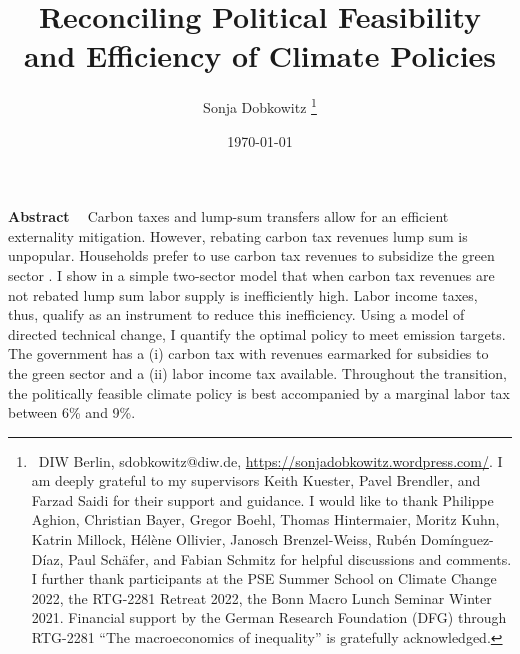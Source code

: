 \documentclass[12pt]{article}
\title{Reconciling Political Feasibility and Efficiency of Climate Policies}
\author{Sonja Dobkowitz
\thanks{\ {DIW Berlin, sdobkowitz@diw.de, \url{https://sonjadobkowitz.wordpress.com/}.} \newline
	I am deeply grateful to my supervisors Keith Kuester, Pavel Brendler, and Farzad Saidi for their support and guidance. 
	I would like to thank Philippe Aghion, Christian Bayer, Gregor Boehl, Thomas Hintermaier,  Moritz Kuhn, Katrin Millock, Hélène Ollivier,  Janosch Brenzel-Weiss, Rubén Domínguez-Díaz, Paul Schäfer, and Fabian Schmitz for helpful discussions and comments.  
	I further thank participants at the PSE Summer School on Climate Change 2022, the RTG-2281 Retreat 2022, the Bonn Macro Lunch Seminar Winter 2021.
	Financial support by the German Research Foundation (DFG) through RTG-2281 “The macroeconomics of inequality” is gratefully acknowledged.}}
\date{\today %
}
\renewenvironment{abstract}
{\small
	\list{}{
		\setlength{\leftmargin}{0.025\textwidth}%
		\setlength{\rightmargin}{\leftmargin}%
	}%
	\item\relax}
{\endlist}
\begin{document}
%	
	\maketitle
	\begin{abstract}
		\begin{singlespacing}
			\textbf{Abstract \ }
			Carbon taxes and lump-sum transfers allow for an efficient externality mitigation. However, rebating carbon tax revenues lump sum is unpopular. Households prefer to use carbon tax revenues to subsidize the green sector \citep{Fabre2023Fighting}.
			I show in a simple two-sector model that when carbon tax revenues are not rebated lump sum labor supply is inefficiently high. 
Labor income taxes, thus, qualify as an instrument to reduce this inefficiency.
Using a model of directed technical change, I quantify the optimal policy to meet emission targets. The government has a (i) carbon tax with revenues earmarked for subsidies to the green sector and a (ii) labor income tax available. Throughout the transition, the politically feasible climate policy is best accompanied by a marginal labor tax between 6\% and 9\%.
			

\end{singlespacing}
\end{abstract}
\end{document}
